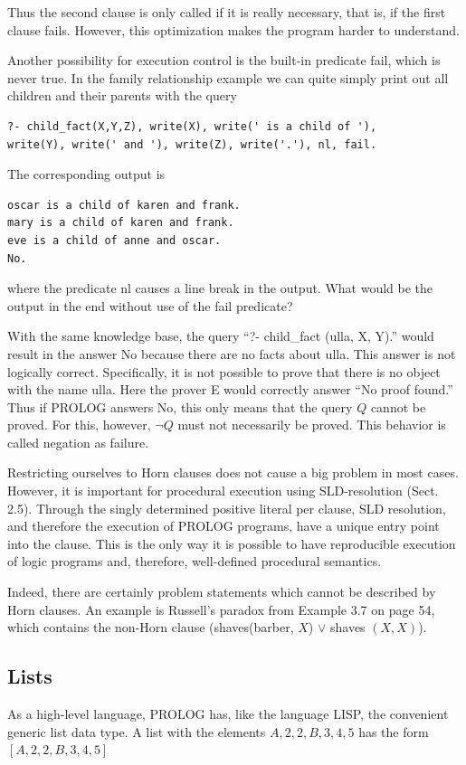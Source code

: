 \documentclass[10pt]{book}
\begin{document}
Thus the second clause is only called if it is really necessary, that is, if the first clause fails. However, this optimization makes the program harder to understand.

Another possibility for execution control is the built-in predicate fail, which is never true. In the family relationship example we can quite simply print out all children and their parents with the query

\begin{verbatim}
?- child_fact(X,Y,Z), write(X), write(' is a child of '),
write(Y), write(' and '), write(Z), write('.'), nl, fail.
\end{verbatim}

The corresponding output is

\begin{verbatim}
oscar is a child of karen and frank.
mary is a child of karen and frank.
eve is a child of anne and oscar.
No.
\end{verbatim}

where the predicate nl causes a line break in the output. What would be the output in the end without use of the fail predicate?

With the same knowledge base, the query ``?- child\_fact (ulla, X, Y).'' would result in the answer No because there are no facts about ulla. This answer is not logically correct. Specifically, it is not possible to prove that there is no object with the name ulla. Here the prover E would correctly answer ``No proof found.'' Thus if PROLOG answers No, this only means that the query $Q$ cannot be proved. For this, however, $\neg Q$ must not necessarily be proved. This behavior is called negation as failure.

Restricting ourselves to Horn clauses does not cause a big problem in most cases. However, it is important for procedural execution using SLD-resolution (Sect. 2.5). Through the singly determined positive literal per clause, SLD resolution, and therefore the execution of PROLOG programs, have a unique entry point into the clause. This is the only way it is possible to have reproducible execution of logic programs and, therefore, well-defined procedural semantics.

Indeed, there are certainly problem statements which cannot be described by Horn clauses. An example is Russell's paradox from Example 3.7 on page 54, which contains the non-Horn clause (shaves(barber, $X$) $\vee$ shaves $(X, X)$).

\subsection{Lists}
As a high-level language, PROLOG has, like the language LISP, the convenient generic list data type. A list with the elements $A, 2,2, B, 3,4,5$ has the form\\
$[A, 2, 2, B, 3, 4, 5]$
\end{document}
